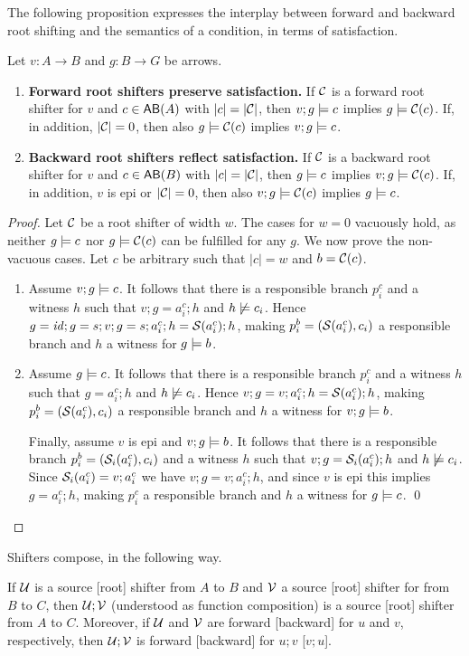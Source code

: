 The following proposition expresses the interplay between forward and backward root shifting and the semantics of a condition, in terms of satisfaction.
%
\begin{proposition}
Let $v:A\to B$ and $g:B\to G$ be arrows.
\begin{enumerate}
\item {\bfseries Forward root shifters preserve satisfaction.} If $\mathcal{C}$ is a forward root shifter for $v$ and $c\in\AB A$ with $|c|=|\mathcal{C}|$, then $v;g\models c$ implies $g\models \mathcal{C}(c)$. If, in addition, $|\mathcal{C}|=0$, then also $g\models \mathcal{C}(c)$ implies $v;g\models c$.
\item {\bfseries Backward root shifters reflect satisfaction.} If $\mathcal{C}$ is a backward root shifter for $v$ and $c\in\AB B$ with $|c|=|\mathcal{C}|$, then $g\models c$ implies $v;g\models \mathcal{C}(c)$. If, in addition, $v$ is epi or $|\mathcal{C}|=0$, then also $v;g\models \mathcal{C}(c)$ implies $g\models c$.
\end{enumerate}
\end{proposition}
%
\begin{proof}
Let $\mathcal{C}$ be a root shifter of width $w$. The cases for $w=0$ vacuously hold, as neither $g\models c$ nor $g\models \mathcal{C}(c)$ can be fulfilled for any $g$. We now prove the non-vacuous cases. Let $c$ be arbitrary such that $|c|=w$ and $b=\mathcal{C}(c)$.
\begin{enumerate}
\item Assume $v;g\models c$. It follows that there is a responsible branch $p^c_i$ and a witness $h$ such that $v;g=a^c_i;h$ and $h\not\models c_i$. Hence $g=\mathit{id};g=s;v;g=s;a^c_i;h=\mathcal{S}(a^c_i);h$, making $p^b_i=(\mathcal{S}(a^c_i),c_i)$ a responsible branch and $h$ a witness for $g\models b$.

\item Assume $g\models c$. It follows that there is a responsible branch $p^c_i$ and a witness $h$ such that $g=a^c_i;h$ and $h\not\models c_i$. Hence $v;g=v;a^c_i;h=\mathcal{S}(a^c_i);h$, making $p^b_i=(\mathcal{S}(a^c_i),c_i)$ a responsible branch and $h$ a witness for $v;g\models b$.

\smallskip
Finally, assume $v$ is epi and $v;g\models b$. It follows that there is a responsible branch $p^b_i=(\mathcal{S}_i(a^c_i),c_i)$ and a witness $h$ such that $v;g=\mathcal{S}_i(a^c_i);h$ and $h\not\models c_i$. Since $\mathcal{S}_i(a^c_i)=v;a^c_i$ we have $v;g=v;a^c_i;h$, and since $v$ is epi this implies $g=a^c_i;h$, making $p^c_i$ a responsible branch and $h$ a witness for $g\models c$.
\qed
\end{enumerate}
\end{proof}
%
Shifters compose, in the following way.
%
\begin{proposition}
If $\mathcal{U}$ is a source [root] shifter from $A$ to $B$ and $\mathcal{V}$ a source [root] shifter for from $B$ to $C$, then $\mathcal{U};\mathcal{V}$ (understood as function composition) is a source [root] shifter from $A$ to $C$. Moreover, if $\mathcal{U}$ and $\mathcal{V}$ are forward [backward] for $u$ and $v$, respectively, then $\mathcal{U};\mathcal{V}$ is forward [backward] for $u;v$ [$v;u$].
\end{proposition}

